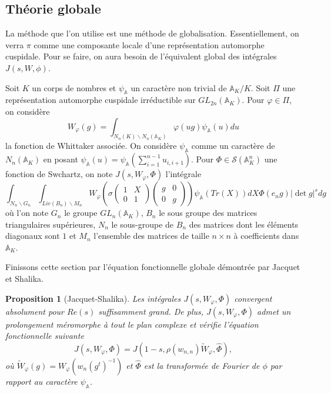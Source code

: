 \documentclass{amsart}
\newtheorem{proposition}{Proposition}[section]
\begin{document}
  \subsection{Théorie globale}
  La méthode que l'on utilise est une méthode de globalisation. Essentiellement, on verra $\pi$ comme une composante locale d'une représentation automorphe cuspidale. Pour se faire, on aura besoin de l'équivalent global des intégrales $J(s, W, \phi)$.
  
  Soit $K$ un corps de nombres et $\psi_\mathbb{A}$ un caractère non trivial de $\mathbb{A}_K/K$. Soit $\Pi$ une représentation automorphe cuspidale irréductible sur $GL_{2n}(\mathbb{A}_K)$. Pour $\varphi \in \Pi$, on considère
  \begin{equation}
  W_\varphi(g) = \int_{N_n(K)\backslash{N_n(\mathbb{A}_K)}} \varphi(ug)\psi_\mathbb{A}(u)du
  \end{equation}
  la fonction de Whittaker associée. On considère $\psi_\mathbb{A}$ comme un caractère de $N_n(\mathbb{A}_K)$ en posant $\psi_\mathbb{A}(u) = \psi_\mathbb{A}(\sum_{i=1}^{n-1} u_{i,i+1})$. Pour $\Phi \in \mathcal{S}(\mathbb{A}_K^n)$ une fonction de Swchartz, on note $J(s, W_\varphi, \Phi)$ l'intégrale
  \begin{equation}
\int_{N_n\backslash{G_n}} \int_{Lie(B_n)\backslash{M_n}} W_\varphi \left(\sigma \begin{pmatrix}
1 & X \\
0 & 1
\end{pmatrix}\begin{pmatrix}
g & 0 \\
0 & g
\end{pmatrix}\right)\psi_\mathbb{A}(Tr(X))dX\Phi(e_ng)|\det g|^s dg
 \end{equation}
 où l'on note $G_n$ le groupe $GL_n(\mathbb{A}_K)$, $B_n$ le sous groupe des matrices triangulaires supérieures, $N_n$ le sous-groupe de $B_n$ des matrices dont les éléments diagonaux sont $1$ et $M_n$ l'ensemble des matrices de taille $n \times n$ à coefficients dans $\mathbb{A}_K$.
 
  Finissons cette section par l'équation fonctionnelle globale démontrée par Jacquet et Shalika.
 \begin{proposition}[Jacquet-Shalika]
 \label{funcglob}
 Les intégrales $J(s, W_\varphi, \Phi)$ convergent absolument pour $Re(s)$ suffisamment grand. De plus, $J(s, W_\varphi, \Phi)$ admet un prolongement méromorphe à tout le plan complexe et vérifie l'équation fonctionnelle suivante
 \begin{equation}
 J(s,W_\varphi,\Phi)=J(1-s, \rho(w_{n,n})\tilde{W}_\varphi, \hat{\Phi}),
 \end{equation}
 où $\tilde{W}_\varphi(g) = W_\varphi(w_n(g^t)^{-1})$ et $\hat{\Phi}$ est la transformée de Fourier de $\phi$ par rapport au caractère $\psi_\mathbb{A}$.
 \end{proposition}
 
\end{document}
